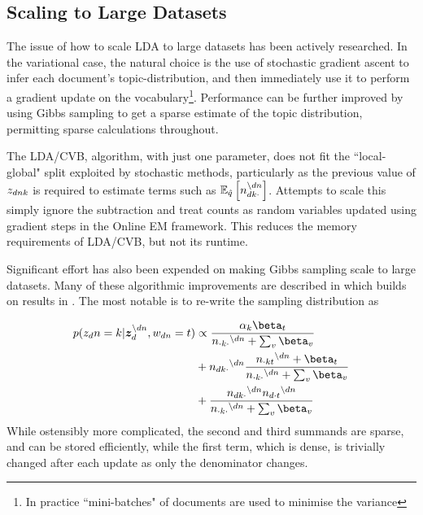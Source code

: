 

\subsection*{Scaling to Large Datasets}
The issue of how to scale LDA to large datasets has been actively researched. In the variational case, the natural choice is the use of stochastic gradient ascent\cite{Bottou2004}\cite{Bottou2008} to infer each document's topic-distribution, and then immediately use it to perform a gradient update on the vocabulary\cite{Hoffman2010}\footnote{In practice ``mini-batches" of documents are used to minimise the variance}. Performance can be further improved by using Gibbs sampling to get a sparse estimate of the topic distribution, permitting sparse calculations throughout\cite{Mimno2012a}.

The LDA/CVB, algorithm, with just one parameter, does not fit the ``local-global" split exploited by stochastic methods, particularly as the previous value of $\zdnk$ is required to estimate terms such as $\ex{n_{dk\cdot}^{\setminus dn}}{\hat{q}}$. Attempts to scale this\cite{Boyles2013} simply ignore the subtraction and treat counts as random variables updated using gradient steps in the Online EM framework\cite{Cappe2009}. This reduces the memory requirements of LDA/CVB, but not its runtime.

Significant effort has also been expended on making Gibbs sampling scale to large datasets. Many of these algorithmic improvements are described in \cite{Yao2009} which builds on results in \cite{Porteous2008}. The most notable is to re-write the sampling distribution as

\newcommand \nodn { { ^{\setminus dn } } }

\begin{align}
\begin{split}
p(z_dn = k | \vv{z}_{d}^{\setminus dn}, w_{dn}=t) & \propto \frac{\alpha_k \beta_t}{n_{\cdot k \cdot}\nodn + \sum_v \beta_v} \\
& + n_{dk\cdot}\nodn \frac{n_{\cdot kt}\nodn + \beta_t}{n_{\cdot k \cdot}\nodn + \sum_v \beta_v} \\
& + \frac{n_{dk\cdot}\nodn n_{d\cdot t}\nodn}{n_{\cdot k \cdot}\nodn + \sum_v \beta_v}
\end{split}
\end{align}
While ostensibly more complicated, the second and third summands are sparse, and can be stored efficiently, while the first term, which is dense, is trivially changed after each update as only the denominator changes.


